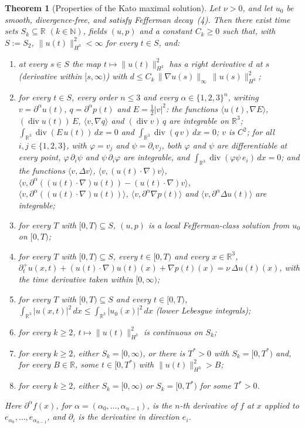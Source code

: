 \documentclass[11pt]{article}
\newcommand{\R}{\mathbb{R}}
\newtheorem{theorem}{Theorem}
\theoremstyle{definition}
\theoremstyle{remark}
\begin{document}
\begin{theorem}[Properties of the Kato maximal solution]
\label{thm:T2-9}
Let $\nu>0$, and let $u_0$ be smooth, divergence-free, and satisfy Fefferman decay~(4). Then there exist time sets $S_k\subseteq\R$ $(k\in\mathbb{N})$, fields $(u,p)$ and a constant $C_k\ge 0$ such that, with $S:=S_2$, $\|u(t)\|_{H^3}^2<\infty$ for every $t\in S$, and:
\begin{enumerate}[label=(T\arabic*),start=2,leftmargin=*]
\item\label{thm:T2} at every $s\in S$ the map $t\mapsto\|u(t)\|_{H^3}^2$ has a right derivative $d$ at $s$ (derivative within $[s,\infty)$) with $d\le C_k\,\|\nabla u(s)\|_\infty\,\|u(s)\|_{H^3}^2$;
\item\label{thm:T3} for every $t\in S$, every order $n\le 3$ and every $\alpha\in\{1,2,3\}^n$, writing $v=\partial^\alpha u(t)$, $q=\partial^\alpha p(t)$ and $E=\tfrac12|v|^2$: the functions $\langle u(t),\nabla E\rangle$, $(\operatorname{div}u(t))\,E$, $\langle v,\nabla q\rangle$ and $(\operatorname{div}v)\,q$ are integrable on $\R^3$; $\int_{\R^3}\operatorname{div}(E\,u(t))\,dx=0$ and $\int_{\R^3}\operatorname{div}(q\,v)\,dx=0$; $v$ is $C^2$; for all $i,j\in\{1,2,3\}$, with $\varphi=v_j$ and $\psi=\partial_i v_j$, both $\varphi$ and $\psi$ are differentiable at every point, $\varphi\,\partial_i\psi$ and $\psi\,\partial_i\varphi$ are integrable, and $\int_{\R^3}\operatorname{div}(\varphi\psi\,e_i)\,dx=0$; and the functions $\langle v,\Delta v\rangle$, $\langle v,(u(t)\cdot\nabla)v\rangle$, $\langle v,\partial^\alpha((u(t)\cdot\nabla)u(t))-(u(t)\cdot\nabla)v\rangle$, $\langle v,\partial^\alpha((u(t)\cdot\nabla)u(t))\rangle$, $\langle v,\partial^\alpha\nabla p(t)\rangle$ and $\langle v,\partial^\alpha\Delta u(t)\rangle$ are integrable;
\item\label{thm:T4} for every $T$ with $[0,T)\subseteq S$, $(u,p)$ is a local Fefferman-class solution from $u_0$ on $[0,T)$;
\item\label{thm:T5} for every $T$ with $[0,T)\subseteq S$, every $t\in[0,T)$ and every $x\in\R^3$, $\partial_t^+u(x,t)+(u(t)\cdot\nabla)u(t)(x)+\nabla p(t)(x)=\nu\,\Delta u(t)(x)$, with the time derivative taken within $[0,\infty)$;
\item\label{thm:T6} for every $T$ with $[0,T)\subseteq S$ and every $t\in[0,T)$, $\int_{\R^3}|u(x,t)|^2\,dx\le\int_{\R^3}|u_0(x)|^2\,dx$ (lower Lebesgue integrals);
\item\label{thm:T7} for every $k\ge 2$, $t\mapsto\|u(t)\|_{H^3}^2$ is continuous on $S_k$;
\item\label{thm:T8} for every $k\ge 2$, either $S_k=[0,\infty)$, or there is $T^*>0$ with $S_k=[0,T^*)$ and, for every $B\in\R$, some $t\in[0,T^*)$ with $\|u(t)\|_{H^3}^2>B$;
\item\label{thm:T9} for every $k\ge 2$, either $S_k=[0,\infty)$ or $S_k=[0,T^*)$ for some $T^*>0$.
\end{enumerate}
Here $\partial^\alpha f(x)$, for $\alpha=(\alpha_0,\dots,\alpha_{n-1})$, is the $n$-th derivative of $f$ at $x$ applied to $e_{\alpha_0},\dots,e_{\alpha_{n-1}}$, and $\partial_i$ is the derivative in direction $e_i$.


\end{theorem}
\end{document}
